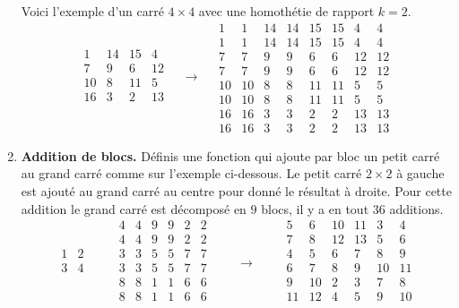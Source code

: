 \documentclass[11pt,class=report,crop=false]{standalone}
\begin{document}
\begin{activite}
\begin{enumerate}
Voici l'exemple d'un carré $4\times 4$ avec une homothétie de rapport $k=2$.
$$  
  \begin{array}{c|c|c|c}  
  1& 14& 15& 4\\\hline
  7& 9& 6& 12\\\hline
  10& 8& 11& 5\\\hline
  16& 3& 2& 13\\    
  \end{array} 
\quad  \longrightarrow \quad 
  \begin{array}{cc|cc|cc|cc}
 1& 1&14&14&15&15& 4& 4\\
  1& 1&14&14&15&15& 4& 4\\\hline
  7& 7& 9& 9& 6& 6&12&12\\
  7& 7& 9& 9& 6& 6&12&12\\\hline
 10&10& 8& 8&11&11& 5& 5\\
 10&10& 8& 8&11&11& 5& 5\\\hline
 16&16& 3& 3& 2& 2&13&13\\
 16&16& 3& 3& 2& 2&13&13
 \end{array}
  $$
  
\item \textbf{Addition de blocs.} Définis une fonction  qui ajoute par bloc un petit carré au grand carré comme sur l'exemple ci-dessous. Le petit carré $2 \times 2$ à gauche est ajouté au grand carré au centre pour donné le résultat à droite. Pour cette addition le grand carré est décomposé en $9$ blocs, il y a en tout $36$ additions.
$$
  \begin{array}{cc} 
  1& 2  \\
  3& 4  \\
  \end{array}
  \qquad
  \begin{array}{cc|cc|cc}  
  4& 4& 9& 9& 2& 2  \\
  4& 4& 9& 9& 2& 2  \\\hline
  3& 3& 5& 5& 7& 7  \\
  3& 3& 5& 5& 7& 7  \\\hline
  8& 8& 1& 1& 6& 6  \\
  8& 8& 1& 1& 6& 6  \\
  \end{array}
  \qquad  \longrightarrow \qquad
  \begin{array}{cc|cc|cc}
  5& 6&10&11& 3& 4  \\
  7& 8&12&13& 5& 6  \\\hline
  4& 5& 6& 7& 8& 9  \\
  6& 7& 8& 9&10&11  \\\hline
  9&10& 2& 3& 7& 8  \\
 11&12& 4& 5& 9&10  \\
  \end{array}
$$


\end{enumerate}
\end{activite}
\end{document}
